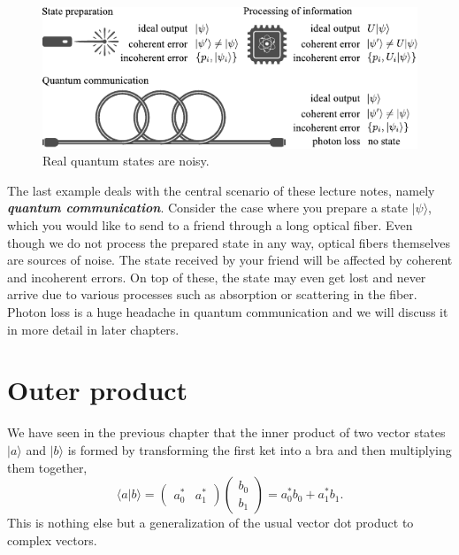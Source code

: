 \begin{figure}[t]
    \centering
    \includegraphics[width=\textwidth]{lesson3/3-1_noise.pdf}
    \caption[Noisy world]{Real quantum states are noisy.}
    \label{fig:3-1_noise}
\end{figure}

The last example deals with the central scenario of these lecture notes, namely \textit{\textbf{quantum communication}}.
Consider the case where you prepare a state $|\psi\rangle$, which you would like to send to a friend through a long optical fiber.
Even though we do not process the prepared state in any way, optical fibers themselves are sources of noise.
The state received by your friend will be affected by coherent and incoherent errors.
On top of these, the state may even get lost and never arrive due to various processes such as absorption or scattering in the fiber.
Photon loss is a huge headache in quantum communication and we will discuss it in more detail in later chapters.





\section{Outer product}
\label{sec:3-2_outer_product}

We have seen in the previous chapter that the inner product of two vector states $|a\rangle$ and $|b\rangle$ is formed by transforming the first ket into a bra and then multiplying them together,
\begin{equation}
    \langle a | b\rangle = \begin{pmatrix} a_0^* & a_1^* \end{pmatrix} \begin{pmatrix} b_0 \\ b_1 \end{pmatrix} = a_0^* b_0 + a_1^* b_1.
\end{equation}
This is nothing else but a generalization of the usual vector dot product to complex vectors.

